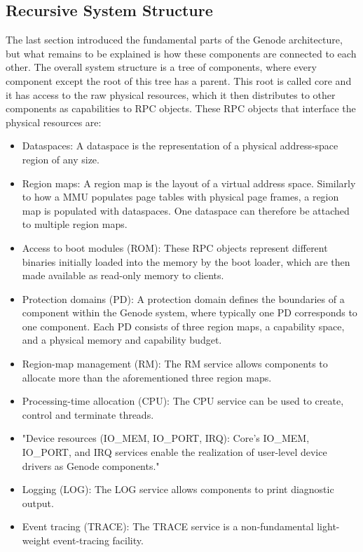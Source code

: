 \subsection{Recursive System Structure}
The last section introduced the fundamental parts of the Genode architecture, but what remains to be explained is how these components are connected to each other. The overall system structure is a tree of components, where every component except the root of this tree has a parent. This root is called core and it has access to the raw physical resources, which it then distributes to other components as capabilities to RPC objects. These RPC objects that interface the physical resources are:
\begin{itemize}
    \item Dataspaces: A dataspace is the representation of a physical address-space region of any size.
    \item Region maps: A region map is the layout of a virtual address space. Similarly to how a MMU populates page tables with physical page frames, a region map is populated with dataspaces. One dataspace can therefore be attached to multiple region maps.
    \item Access to boot modules (ROM): These RPC objects represent different binaries initially loaded into the memory by the boot loader, which are then made available as read-only memory to clients. 
    \item Protection domains (PD): A protection domain defines the boundaries of a component within the Genode system, where typically one PD corresponds to one component. Each PD consists of three region maps, a capability space, and a physical memory and capability budget.
    \item Region-map management (RM): The RM service allows components to allocate more than the aforementioned three region maps.
    \item Processing-time allocation (CPU): The CPU service can be used to create, control and terminate threads.
    \item "Device resources (IO\_MEM, IO\_PORT, IRQ): Core’s IO\_MEM, IO\_PORT, and IRQ services enable the realization of user-level device drivers as Genode components." \cite[P.69]{genode_foundations}
    \item Logging (LOG): The LOG service allows components to print diagnostic output.
    \item Event tracing (TRACE): The TRACE service is a non-fundamental light-weight event-tracing facility.
\end{itemize}
\cite[P.65-71]{genode_foundations}

